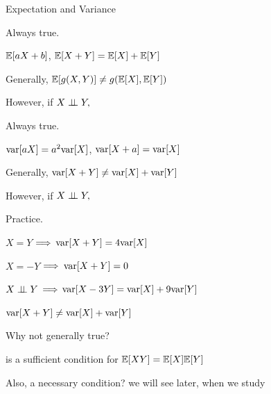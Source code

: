 \documentclass[fleqn,aspectratio=169]{beamer}
\begin{document}
\begin{frame}{Expectation and Variance}

{
\plitemsep 0.05in
\bci 

\item<1-> Always true. 

$\mathbb{E}[ aX +b ]$, $\mathbb{E}[ X+Y ] = \mathbb{E}[ X ] + \mathbb{E}[ Y ]$

\item<2-> Generally,
$\mathbb{E}[ g(X,Y) ] \neq g(\mathbb{E}[ X ],\mathbb{E}[ Y ])$

\medskip

\item<3-> However, if $X \perp \!\!\! \perp Y,$
\item<4-> 

\eci
}
{
\plitemsep 0.1in
\bci 

\item<5-> Always true. 

$\text{var}[ aX ] = a^2 \text{var}[ X ]$, $\text{var}[ X + a ] = \text{var}[ X ]$

\item<6-> Generally,
$\text{var}[ X+Y ] \neq \text{var}[ X ] + \text{var}[ Y ]$

\medskip

\item<7-> However, if $X \perp \!\!\! \perp Y,$

\item<7-> Practice.

\plitemsep 0.02in
\bci
\item<8-> $X=Y$ $\Longrightarrow$ $\text{var}[ X+Y ] = 4 \text{var}[ X ]$
\item<9-> $X=-Y$ $\Longrightarrow$ $\text{var}[ X+Y ] = 0$
\item<10-> $X \perp \!\!\! \perp Y$ $\Longrightarrow$ $\text{var}[ X-3Y ] = \text{var}[ X ] + 9 \text{var}[ Y ]$
\eci

\eci

}
\end{frame}


\begin{frame}{$\text{var}[ X + Y ] \neq \text{var}[ X ] + \text{var}[ Y ]$}

\plitemsep 0.1in
\bci [$\circ$]

\item<1-> Why not generally true?


\item<3->  is a sufficient condition for $\mathbb{E}[ XY ] = \mathbb{E}[ X ]\mathbb{E}[ Y ]$ 

\item<5-> Also, a necessary condition? we will see later, when we study  
\eci

\end{frame}
\end{document}

